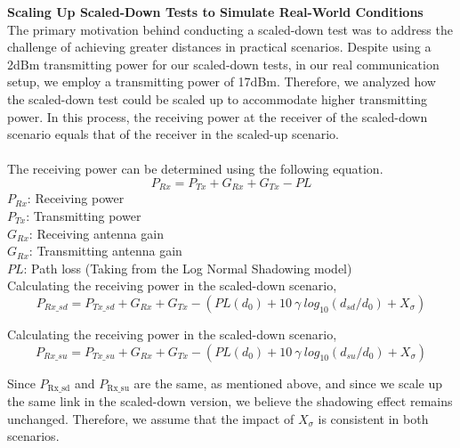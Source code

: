\noindent \textbf{Scaling Up Scaled-Down Tests to Simulate Real-World Conditions}\\

The primary motivation behind conducting a scaled-down test was to address the challenge of achieving greater distances in practical scenarios. Despite using a 2dBm transmitting power for our scaled-down tests, in our real communication setup, we employ a transmitting power of 17dBm. Therefore, we analyzed how the scaled-down test could be scaled up to accommodate higher transmitting power. In this process, the receiving power at the receiver of the scaled-down scenario equals that of the receiver in the scaled-up scenario.\\
\\
The receiving power can be determined using the following equation.
\begin{equation}
    P_{Rx} = P_{Tx} + G_{Rx} + G_{Tx} - PL 
\end{equation}
$P_{Rx}$: Receiving power\\
$P_{Tx}$: Transmitting power\\
$G_{Rx}$: Receiving antenna gain\\
$G_{Rx}$: Transmitting antenna gain\\
$PL$: Path loss (Taking from the Log Normal Shadowing model)\\

\noindent Calculating the receiving power in the scaled-down scenario,
\begin{equation}
    P_{Rx\_sd} = P_{Tx\_sd} + G_{Rx} + G_{Tx} - (PL(d_{0}) + 10 \: \gamma \: log_{10}(d_{sd}/d_{0}) + X_{\sigma})
\end{equation}

\noindent Calculating the receiving power in the scaled-down scenario,
\begin{equation}
    P_{Rx\_su} = P_{Tx\_su} + G_{Rx} + G_{Tx} - (PL(d_{0}) + 10 \: \gamma \: log_{10}(d_{su}/d_{0}) + X_{\sigma})
\end{equation}

Since \( P_{\text{Rx\_sd}} \) and \( P_{\text{Rx\_su}} \) are the same, as mentioned above, and since we scale up the same link in the scaled-down version, we believe the shadowing effect remains unchanged. Therefore, we assume that the impact of \( X_{\sigma} \) is consistent in both scenarios.\\

